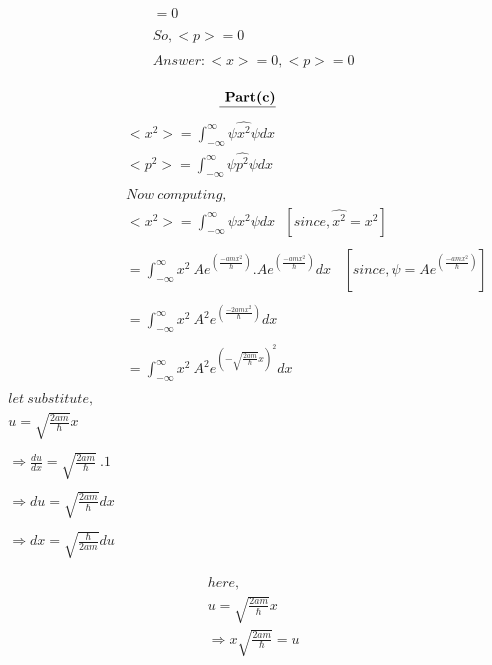 \documentclass{article}
\begin{document}
\begin{homeworkProblem}
\begin{align*}
  &=0\\\\
  &So, <p> = 0\\\\
  &Answer:<x>=0 ,<p>=0\\\\
\end{align*}
\newpage\vspace{5mm}
 \[
    \textbf{\underline{ Part(c)}}
    \]
\hspace{20mm}
\large
\begin{align*}
  &<x^{2}> =\int_{-\infty}^{\infty}\psi \hat{x^{2}} \psi dx\\
  &<p^{2}> =\int_{-\infty}^{\infty}\psi \hat{ p^{2}} \psi dx\\\\
  &Now\ computing,\\
  &<x^{2}> =\int_{-\infty}^{\infty}\psi x^{2} \psi dx\ \ \ [since,\hat{x^{2}} = x^{2}]\\\\
  &= \int_{-\infty}^{\infty}x^{2}\ A e^{( \frac{-amx^{2}}{\hbar})} . A e^{( \frac{-amx^{2}}{\hbar})} dx\ \ \ \ [since, \psi =A e^{( \frac{-amx^{2}}{\hbar})}]\\\\
   &= \int_{-\infty}^{\infty}x^{2}\ A^{2} e^{(\frac{-2amx^{2}}{\hbar})} dx \\\\
   &= \int_{-\infty}^{\infty}x^{2}\ A^{2} e^{(-{\sqrt{\frac{2am}{\hbar}}}x)}^{2} dx \\\\
   let\ substitute,\\
   u = {\sqrt{\frac{2am}{\hbar}}} x\\\\
   \Rightarrow \frac{du}{dx} = {\sqrt{\frac{2am}{\hbar}}} \ . 1\\\\
   \Rightarrow du = {\sqrt{\frac{2am}{\hbar}}} dx\\\\
   \Rightarrow dx =  {\sqrt{\frac{\hbar}{2am}}} du\\\\
\end{align*}
\newpage\vspace{5mm}
\hspace{20mm}
\large
\begin{align*}
   &here,\\
  & u = {\sqrt{\frac{2am}{\hbar}}} x\\
  &\Rightarrow x {\sqrt{\frac{2am}{\hbar}}}= u\\

\end{align*}
\end{homeworkProblem}
\end{document}
